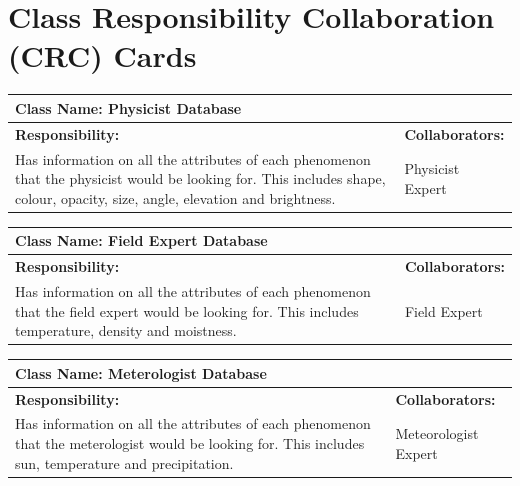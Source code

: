\documentclass[]{article}
\begin{document}

	
\section{Class Responsibility Collaboration (CRC) Cards}
\label{sec:class_responsibility_collaboration_crc_cards}


	\begin{table}[!hb]
		\centering
		\begin{tabular}{|p{5cm}|p{5cm}|}
		\hline 
		 \multicolumn{2}{|l|}{\textbf{Class Name: Physicist Database}} \\
		\hline
		\textbf{Responsibility:} & \textbf{Collaborators:} \\
		\hline
		Has information on all the attributes of each phenomenon that the physicist would be looking for. This includes shape, colour, opacity, size, 				angle, elevation and brightness. & Physicist Expert \\
		\hline
		\end{tabular}
	\end{table}
	
\pagebreak

	\begin{table}[!hb]
		\centering
		\begin{tabular}{|p{5cm}|p{5cm}|}
		\hline 
		 \multicolumn{2}{|l|}{\textbf{Class Name:  Field Expert Database}} \\
		\hline
		\textbf{Responsibility:} & \textbf{Collaborators:} \\
		\hline
		Has information on all the attributes of each phenomenon that the field expert would be looking for. This includes  temperature, density and 			moistness.  & Field Expert\\
		\hline
		\end{tabular}
	\end{table}

 

	\begin{table}[!hb]
		\centering
		\begin{tabular}{|p{5cm}|p{5cm}|}
		\hline 
		 \multicolumn{2}{|l|}{\textbf{Class Name: Meterologist Database}} \\
		\hline
		\textbf{Responsibility:} & \textbf{Collaborators:} \\
		\hline
		Has information on all the attributes of each phenomenon that the meterologist would be looking for. This includes sun, temperature and precipitation. & Meteorologist Expert\\
		\hline
		\end{tabular}
	\end{table}
\end{document}
